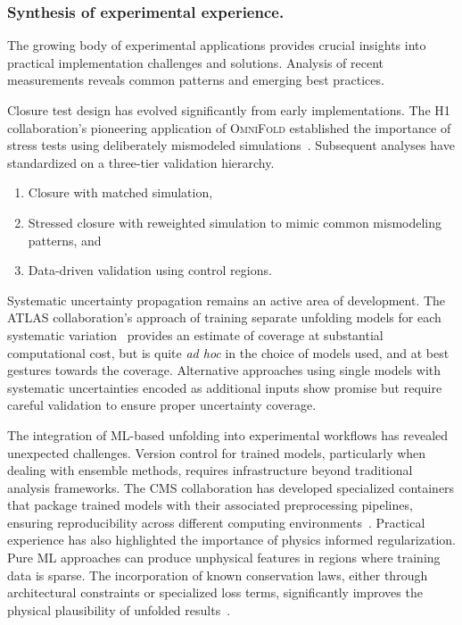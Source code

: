         \subsubsection{Synthesis of experimental experience.}
        The growing body of experimental applications provides crucial insights into practical implementation challenges and solutions.
        Analysis of recent measurements reveals common patterns and emerging best practices.

        Closure test design has evolved significantly from early implementations.
        The H1 collaboration's pioneering application of \textsc{OmniFold} established the importance of stress tests using deliberately mismodeled simulations~\cite{collaboration_measurement_2022}.
        Subsequent analyses have standardized on a three-tier validation hierarchy.
        \begin{enumerate}
            \item Closure with matched simulation,
            \item Stressed closure with reweighted simulation to mimic common mismodeling patterns, and
            \item Data-driven validation using control regions.
        \end{enumerate}
        Systematic uncertainty propagation remains an active area of development.
        The ATLAS collaboration's approach of training separate unfolding models for each systematic variation~\cite{collaboration_measurement_2025} provides an estimate of coverage at substantial computational cost, but is quite \textit{ad hoc} in the choice of models used, and at best gestures towards the coverage.
        Alternative approaches using single models with systematic uncertainties encoded as additional inputs show promise but require careful validation to ensure proper uncertainty coverage.
        
        The integration of ML-based unfolding into experimental workflows has revealed unexpected challenges.
        Version control for trained models, particularly when dealing with ensemble methods, requires infrastructure beyond traditional analysis frameworks.
        The CMS collaboration has developed specialized containers that package trained models with their associated preprocessing pipelines, ensuring reproducibility across different computing environments~\cite{CMS:2024onh}.
        Practical experience has also highlighted the importance of physics informed regularization.
        Pure ML approaches can produce unphysical features in regions where training data is sparse.
        The incorporation of known conservation laws, either through architectural constraints or specialized loss terms, significantly improves the physical plausibility of unfolded results~\cite{Spinner2024Lorentz-EquivariantPhysics}.

